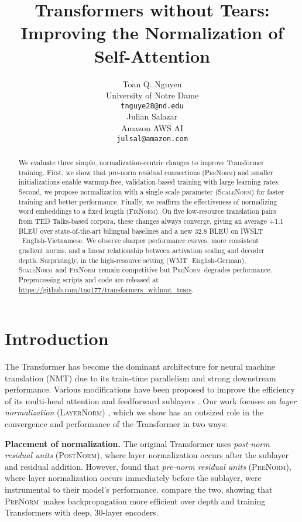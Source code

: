 \documentclass[11pt,a4paper]{article}
\title{Transformers without Tears:\\Improving the Normalization of Self-Attention}
\author{Toan Q. Nguyen\Thanks{\ Equal contribution.} \\
  University of Notre Dame\Thanks{\ Work done during an internship at Amazon AWS AI.} \\
  {\tt tnguye28@nd.edu} \\\And
  Julian Salazar\samethanks[1]\\
  Amazon AWS AI \\
  {\tt julsal@amazon.com} \\
  }
\date{}
\newcommand{\keyword}[1]{\textit{#1}}
\newcommand{\LNorm}{\textsc{LayerNorm}}
\newcommand{\SCNorm}{\textsc{ScaleNorm}}
\newcommand{\PreNorm}{\textsc{PreNorm}}
\newcommand{\PostNorm}{\textsc{PostNorm}}
\newcommand{\fixnorm}{\textsc{FixNorm}}
\newcommand{\WMT}{WMT\,\textquotesingle 14}
\newcommand{\IWSLT}{IWSLT\,\textquotesingle 15}
\renewcommand{\paragraph}[1]{\par\medskip\noindent\textbf{#1}}
\begin{document}
\maketitle

\begin{abstract}
We evaluate three simple, normalization-centric changes to improve  Transformer training. First, we show that pre-norm residual connections (\PreNorm) and smaller initializations enable warmup-free, validation-based training with large learning rates. Second, we propose  normalization with a single scale parameter (\SCNorm) for faster training and better performance. Finally, we reaffirm the effectiveness of normalizing word embeddings to a fixed length (\fixnorm). On five low-resource translation pairs from TED Talks-based corpora, these changes always converge, giving an average +1.1 BLEU over state-of-the-art bilingual baselines and a new 32.8 BLEU on \IWSLT\ English-Vietnamese. We observe sharper performance curves, more consistent gradient norms, and a linear relationship between activation scaling and decoder depth. Surprisingly, in the high-resource setting (\WMT\ English-German), \SCNorm\ and \fixnorm\ remain competitive but \PreNorm\ degrades performance. Preprocessing scripts and code are released at\\ \url{https://github.com/tnq177/transformers_without_tears}.
\end{abstract}

\section{Introduction}
The Transformer \cite{NIPS2017_7181} has become the dominant architecture for neural machine translation (NMT) due to its train-time parallelism and strong downstream performance. Various modifications have been proposed to improve the efficiency of its multi-head attention and feedforward sublayers \cite{Guo2019,Sukhbaatar2019}. Our work focuses on \keyword{layer normalization} (\LNorm) \cite{Ba2015}, which we show has an outsized role in the convergence and performance of the Transformer in two ways:

\paragraph{Placement of normalization.} The original Transformer uses \keyword{post-norm residual units} (\PostNorm), where layer normalization occurs after the sublayer and residual addition. However, \citet{Chen2018} found that \keyword{pre-norm residual units} (\PreNorm), where layer normalization occurs immediately before the sublayer, were instrumental to their model's performance. \citet{Wang2019-learning-deep-transformers} compare the two, showing that \PreNorm\ makes backpropagation more efficient over depth and training Transformers with deep, 30-layer encoders.
\end{document}
